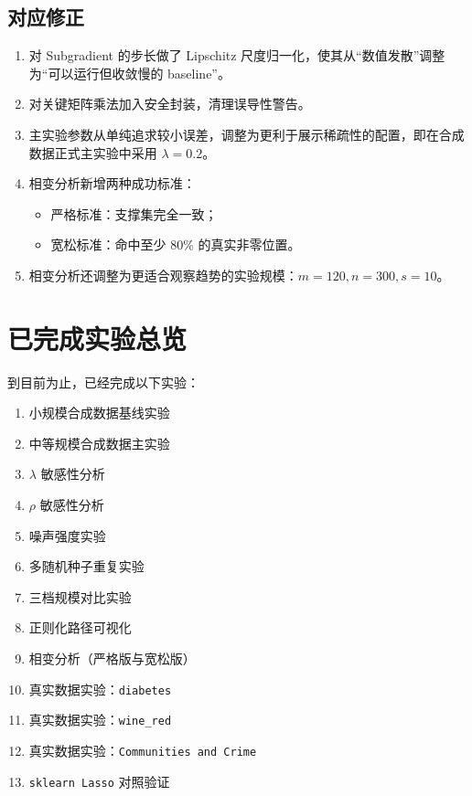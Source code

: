 \documentclass[12pt,a4paper]{ctexart}
\begin{document}
\subsection{对应修正}
\begin{enumerate}[label=\arabic*.]
    \item 对 Subgradient 的步长做了 Lipschitz 尺度归一化，使其从“数值发散”调整为“可以运行但收敛慢的 baseline”。
    \item 对关键矩阵乘法加入安全封装，清理误导性警告。
    \item 主实验参数从单纯追求较小误差，调整为更利于展示稀疏性的配置，即在合成数据正式主实验中采用 $\lambda=0.2$。
    \item 相变分析新增两种成功标准：
    \begin{itemize}[leftmargin=2em]
        \item 严格标准：支撑集完全一致；
        \item 宽松标准：命中至少 80\% 的真实非零位置。
    \end{itemize}
    \item 相变分析还调整为更适合观察趋势的实验规模：$m=120, n=300, s=10$。
\end{enumerate}

\section{已完成实验总览}
到目前为止，已经完成以下实验：
\begin{enumerate}[label=\arabic*.]
    \item 小规模合成数据基线实验
    \item 中等规模合成数据主实验
    \item $\lambda$ 敏感性分析
    \item $\rho$ 敏感性分析
    \item 噪声强度实验
    \item 多随机种子重复实验
    \item 三档规模对比实验
    \item 正则化路径可视化
    \item 相变分析（严格版与宽松版）
    \item 真实数据实验：\texttt{diabetes}
    \item 真实数据实验：\texttt{wine\_red}
    \item 真实数据实验：\texttt{Communities and Crime}
    \item \texttt{sklearn Lasso} 对照验证
\end{enumerate}
\end{document}
